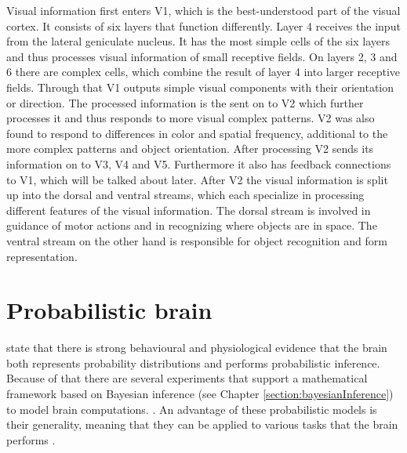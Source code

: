 Visual information first enters V1, which is the best-understood part of the visual cortex. It consists of six layers that function differently. Layer 4 receives the input from the lateral geniculate nucleus. It has the most simple cells of the six layers and thus processes visual information of small receptive fields. On layers 2, 3 and 6 there are complex cells, which combine the result of layer 4 into larger receptive fields. Through that V1 outputs simple visual components with their orientation or direction. The processed information is the sent on to V2 which further processes it and thus responds to more visual complex patterns. V2 was also found to respond to differences in color and spatial frequency, additional to the more complex patterns and object orientation. After processing V2 sends its information on to V3, V4 and V5. Furthermore it also has feedback connections to V1, which will be talked about later. After V2 the visual information is split up into the dorsal and ventral streams, which each specialize in processing different features of the visual information. The dorsal stream is involved in guidance of motor actions and in recognizing where objects are in space. The ventral stream on the other hand is responsible for object recognition and form representation.
\citep{visualCortexBook}

\section{Probabilistic brain}

\citet{probabilisticBrain} state that there is strong behavioural and physiological evidence that the brain both represents probability distributions and performs probabilistic inference. Because of that there are several experiments that support a mathematical framework based on Bayesian inference (see Chapter \ref{section:bayesianInference}) to model brain computations. \citep{neuralSubstrate, HierachicalBayesVisualCortex, anatomyOfInference, neuralImplementationOfBayesionInferenceSensoryMotor}. An advantage of these probabilistic models is their generality, meaning that they can be applied to various tasks that the brain performs \citep{probabilisticBrain}. 	

